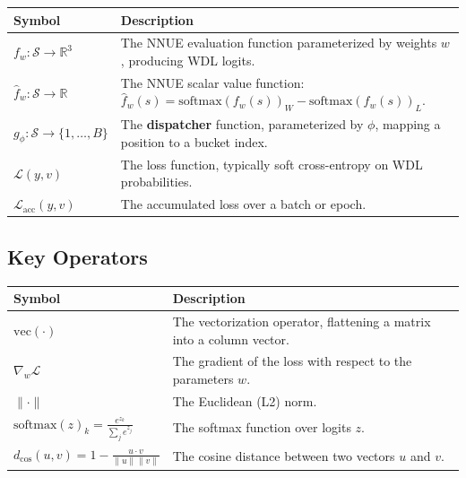 \begin{center}
\small
\begin{tabularx}{\textwidth}{@{}>{\raggedright\arraybackslash}p{} X@{}}
\hline
\textbf{Symbol} & \textbf{Description} \\
\hline
\(f_w: \mathcal{S} \rightarrow \mathbb{R}^3\) &
  The NNUE evaluation function parameterized by weights \(w\), producing WDL logits. \\
\(\hat{f}_w: \mathcal{S} \rightarrow \mathbb{R}\) &
  The NNUE scalar value function: \(\hat{f}_w(s) = \mathrm{softmax}(f_w(s))_W - \mathrm{softmax}(f_w(s))_L\). \\
\(g_\phi: \mathcal{S} \rightarrow \{1, \dots, B\}\) &
  The \textbf{dispatcher} function, parameterized by \(\phi\), mapping a position to a bucket index. \\
\(\mathcal{L}(y, v)\) &
  The loss function, typically soft cross-entropy on WDL probabilities. \\
\(\mathcal{L}_{\mathrm{acc}}(y, v)\) &
  The accumulated loss over a batch or epoch. \\
\hline
\end{tabularx}
\end{center}

\subsection{Key Operators}\label{sec:notation-operators}

\begin{center}
\small
\begin{tabularx}{\textwidth}{@{}>{\raggedright\arraybackslash}p{} X@{}}
\hline
\textbf{Symbol} & \textbf{Description} \\
\hline
\(\mathrm{vec}(\cdot)\) &
  The vectorization operator, flattening a matrix into a column vector. \\
\(\nabla_w \mathcal{L}\) &
  The gradient of the loss with respect to the parameters \(w\). \\
\(\lVert \cdot \rVert\) &
  The Euclidean (L2) norm. \\
\(\mathrm{softmax}(z)_k = \frac{e^{z_k}}{\sum_j e^{z_j}}\) &
  The softmax function over logits \(z\). \\
\(d_{\mathrm{cos}}(u, v) = 1 - \frac{u \cdot v}{\lVert u\rVert \lVert v\rVert}\) &
  The cosine distance between two vectors \(u\) and \(v\). \\
\hline
\end{tabularx}
\end{center}

